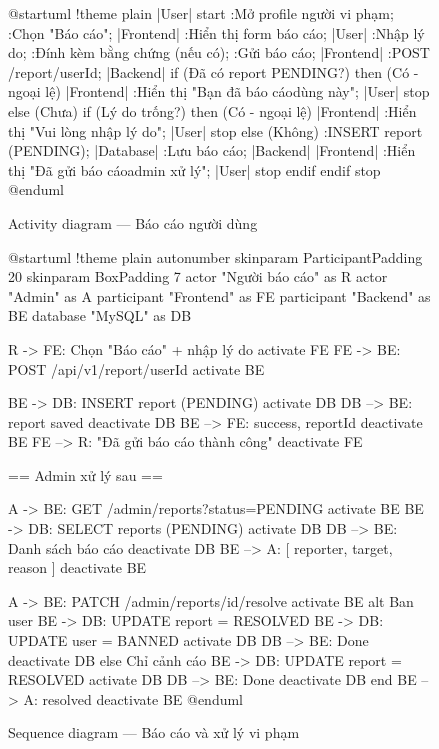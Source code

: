 \documentclass[12pt,a4paper]{report}
\begin{document}
\begin{figure}[H]
    \centering
    \begin{plantuml}
        @startuml
        !theme plain
        |User|
        start
        :Mở profile người vi phạm;
        :Chọn "Báo cáo";
        |Frontend|
        :Hiển thị form báo cáo;
        |User|
        :Nhập lý do;
        :Đính kèm bằng chứng (nếu có);
        :Gửi báo cáo;
        |Frontend|
        :POST /report/{userId};
        |Backend|
        if (Đã có report PENDING?) then (Có - ngoại lệ)
          |Frontend|
          :Hiển thị "Bạn đã báo cáo dùng này";
          |User|
          stop
        else (Chưa)
          if (Lý do trống?) then (Có - ngoại lệ)
            |Frontend|
            :Hiển thị "Vui lòng nhập lý do";
            |User|
            stop
          else (Không)
            :INSERT report (PENDING);
            |Database|
            :Lưu báo cáo;
            |Backend|
            |Frontend|
            :Hiển thị "Đã gửi báo cáo admin xử lý";
            |User|
            stop
          endif
        endif
        stop
        @enduml
    \end{plantuml}
    \caption{Activity diagram --- Báo cáo người dùng}
\end{figure}

\begin{figure}[H]
    \centering
    \begin{plantuml}
        @startuml
        !theme plain
        autonumber
        skinparam ParticipantPadding 20
        skinparam BoxPadding 7
        actor "Người báo cáo" as R
        actor "Admin" as A
        participant "Frontend" as FE
        participant "Backend" as BE
        database "MySQL" as DB

        R -> FE: Chọn "Báo cáo" + nhập lý do
        activate FE
        FE -> BE: POST /api/v1/report/{userId}
        activate BE

        BE -> DB: INSERT report (PENDING)
        activate DB
        DB --> BE: report saved
        deactivate DB
        BE --> FE: { success, reportId }
        deactivate BE
        FE --> R: "Đã gửi báo cáo thành công"
        deactivate FE

        == Admin xử lý sau ==

        A -> BE: GET /admin/reports\n?status=PENDING
        activate BE
        BE -> DB: SELECT reports (PENDING)
        activate DB
        DB --> BE: Danh sách báo cáo
        deactivate DB
        BE --> A: [{ reporter, target, reason }]
        deactivate BE

        A -> BE: PATCH /admin/reports/{id}/resolve
        activate BE
        alt Ban user
          BE -> DB: UPDATE report = RESOLVED
          BE -> DB: UPDATE user = BANNED
          activate DB
          DB --> BE: Done
          deactivate DB
        else Chỉ cảnh cáo
          BE -> DB: UPDATE report = RESOLVED
          activate DB
          DB --> BE: Done
          deactivate DB
        end
        BE --> A: { resolved }
        deactivate BE
        @enduml
    \end{plantuml}
    \caption{Sequence diagram --- Báo cáo và xử lý vi phạm}
\end{figure}
\end{document}
